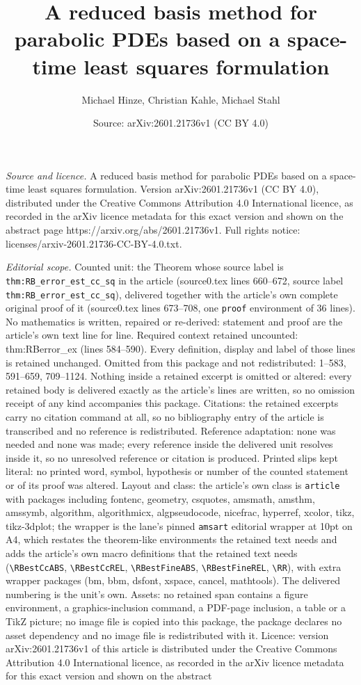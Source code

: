\documentclass[10pt,a4paper]{amsart}
\title[A reduced basis method for parabolic PDEs based on a space-t]{A reduced basis method for parabolic PDEs based on a space-time least squares formulation}
\author{Michael Hinze, Christian Kahle, Michael Stahl}
\date{Source: arXiv:2601.21736v1 (CC BY 4.0)}
\begin{document}
\maketitle

\noindent\emph{Source and licence.} A reduced basis method for parabolic PDEs based on a space-time least squares formulation. Version arXiv:2601.21736v1 (CC BY 4.0), distributed under the Creative Commons Attribution 4.0 International licence, as recorded in the arXiv licence metadata for this exact version and shown on the abstract page https://arxiv.org/abs/2601.21736v1. Full rights notice: licenses/arxiv-2601.21736-CC-BY-4.0.txt.\par\smallskip

\noindent\textit{Editorial scope.} Counted unit: the Theorem whose source label is \texttt{thm:RB\_error\_est\_cc\_sq} in the article (source0.tex lines 660--672, source label \texttt{thm:RB\_error\_est\_cc\_sq}), delivered together with the article's own complete original proof of it (source0.tex lines 673--708, one \texttt{proof} environment of 36 lines). No mathematics is written, repaired or re-derived: statement and proof are the article's own text line for line. Required context retained uncounted: thm:RBerror\_ex (lines 584--590). Every definition, display and label of those lines is retained unchanged. Omitted from this package and not redistributed: 1--583, 591--659, 709--1124. Nothing inside a retained excerpt is omitted or altered: every retained body is delivered exactly as the article's lines are written, so no omission receipt of any kind accompanies this package. Citations: the retained excerpts carry no citation command at all, so no bibliography entry of the article is transcribed and no reference is redistributed. Reference adaptation: none was needed and none was made; every reference inside the delivered unit resolves inside it, so no unresolved reference or citation is produced. Printed slips kept literal: no printed word, symbol, hypothesis or number of the counted statement or of its proof was altered. Layout and class: the article's own class is \texttt{article} with packages including fontenc, geometry, csquotes, amsmath, amsthm, amssymb, algorithm, algorithmicx, algpseudocode, nicefrac, hyperref, xcolor, tikz, tikz-3dplot; the wrapper is the lane's pinned \texttt{amsart} editorial wrapper at 10pt on A4, which restates the theorem-like environments the retained text needs and adds the article's own macro definitions that the retained text needs (\texttt{\textbackslash RBestCcABS}, \texttt{\textbackslash RBestCcREL}, \texttt{\textbackslash RBestFineABS}, \texttt{\textbackslash RBestFineREL}, \texttt{\textbackslash RR}), with extra wrapper packages (bm, bbm, dsfont, xspace, cancel, mathtools). The delivered numbering is the unit's own. Assets: no retained span contains a figure environment, a graphics-inclusion command, a PDF-page inclusion, a table or a TikZ picture; no image file is copied into this package, the package declares no asset dependency and no image file is redistributed with it. Licence: version arXiv:2601.21736v1 of this article is distributed under the Creative Commons Attribution 4.0 International licence, as recorded in the arXiv licence metadata for this exact version and shown on the abstract 
\end{document}
